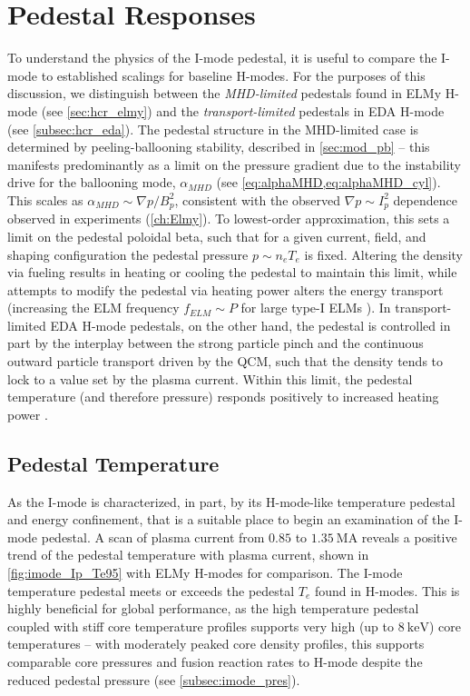 \section{Pedestal Responses}\label{sec:imode_height}

To understand the physics of the I-mode pedestal, it is useful to compare the I-mode to established scalings for baseline H-modes.  For the purposes of this discussion, we distinguish between the \emph{MHD-limited} pedestals found in ELMy H-mode (see \cref{sec:hcr_elmy}) and the \emph{transport-limited} pedestals in EDA H-mode (see \cref{subsec:hcr_eda}).  The pedestal structure in the MHD-limited case is determined by peeling-ballooning stability, described in \cref{sec:mod_pb} -- this manifests predominantly as a limit on the pressure gradient due to the instability drive for the ballooning mode, $\alpha_{MHD}$ (see \cref{eq:alphaMHD,eq:alphaMHD_cyl}).  This scales as $\alpha_{MHD} \sim \nabla p / B_p^2$, consistent with the observed $\nabla p \sim I_p^2$ dependence observed in experiments \cite{Walk2012,Groebner2013} (\cf \cref{ch:Elmy}).  To lowest-order approximation, this sets a limit on the pedestal poloidal beta, such that for a given current, field, and shaping configuration the pedestal pressure $p \sim n_e T_e$ is fixed.  Altering the density via fueling results in heating or cooling the pedestal to maintain this limit, while attempts to modify the pedestal via heating power alters the energy transport (increasing the ELM frequency $f_{ELM} \sim P$ for large type-I ELMs \cite{Urano2003}).  In transport-limited EDA H-mode pedestals, on the other hand, the pedestal is controlled in part by the interplay between the strong particle pinch and the continuous outward particle transport driven by the QCM, such that the density tends to lock to a value set by the plasma current.  Within this limit, the pedestal temperature (and therefore pressure) responds positively to increased heating power \cite{Hubbard2001}.

\subsection{Pedestal Temperature}\label{subsec:imode_temp}

As the I-mode is characterized, in part, by its H-mode-like temperature pedestal and energy confinement, that is a suitable place to begin an examination of the I-mode pedestal.  A scan of plasma current from $\num{0.85}$ to $\SI{1.35}{\mega\ampere}$ reveals a positive trend of the pedestal temperature with plasma current, shown in \cref{fig:imode_Ip_Te95} with ELMy H-modes for comparison.  The I-mode temperature pedestal meets or exceeds the pedestal $T_e$ found in H-modes.  This is highly beneficial for global performance, as the high temperature pedestal coupled with stiff core temperature profiles supports very high (up to $\SI{8}{\kilo\electronvolt}$) core temperatures -- with moderately peaked core density profiles, this supports comparable core pressures and fusion reaction rates to H-mode despite the reduced pedestal pressure (see \cref{subsec:imode_pres}).

